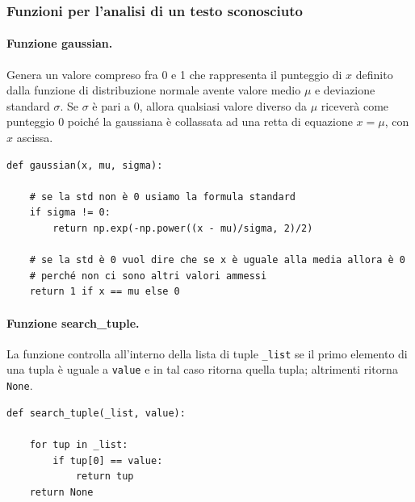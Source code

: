 \documentclass[titlepage]{article}
\begin{document}
\subsubsection{Funzioni per l'analisi di un testo sconosciuto}
\paragraph{Funzione gaussian.}
Genera un valore compreso fra 0 e 1 che rappresenta il punteggio di $x$ definito dalla funzione di distribuzione normale avente valore medio $\mu$ e deviazione standard $\sigma$. Se $\sigma$ è pari a 0, allora qualsiasi valore diverso da $\mu$ riceverà come punteggio 0 poiché la gaussiana è collassata ad una retta di equazione $x=\mu$, con $x$ ascissa.
\begin{verbatim}
def gaussian(x, mu, sigma):

    # se la std non è 0 usiamo la formula standard
    if sigma != 0:
        return np.exp(-np.power((x - mu)/sigma, 2)/2)
    
    # se la std è 0 vuol dire che se x è uguale alla media allora è 0
    # perché non ci sono altri valori ammessi
    return 1 if x == mu else 0
\end{verbatim}

\paragraph{Funzione search\_tuple.}
La funzione controlla all'interno della lista di tuple \texttt{\_list} se il primo elemento di una tupla è uguale a \texttt{value} e in tal caso ritorna quella tupla; altrimenti ritorna \texttt{None}.
\begin{verbatim}
def search_tuple(_list, value):

    for tup in _list:
        if tup[0] == value:
            return tup
    return None
\end{verbatim}
\end{document}
